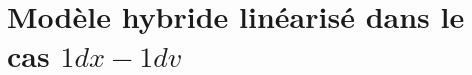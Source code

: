 \renewcommand{\localPath}{chap2}

\chapter{Modèle hybride linéarisé dans le cas $1dx-1dv$}










\begin{subappendices}

\end{subappendices}


